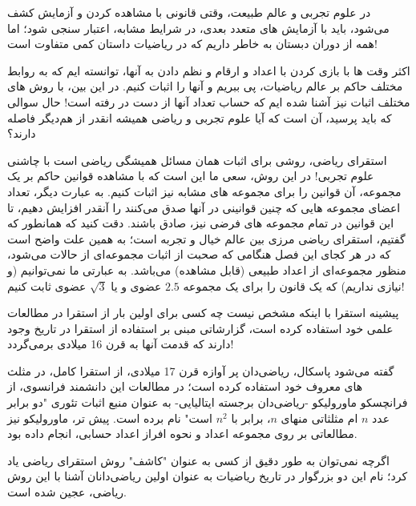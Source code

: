
 در علوم تجربی و عالم طبیعت، وقتی قانونی با مشاهده کردن و آزمایش کشف می‌شود، باید با آزمایش های متعدد بعدی، در شرایط مشابه، اعتبار سنجی شود؛
 اما همه از دوران دبستان به خاطر داریم که در ریاضیات داستان کمی متفاوت است! 

 اکثر وقت ها با بازی کردن با اعداد و ارقام و نظم دادن به آنها، توانسته ایم که به روابط مختلف حاکم بر عالم ریاضیات، پی ببریم و آنها را اثبات کنیم.
 در این بین، با روش های مختلف اثبات نیز آشنا شده ایم که حساب تعداد آنها از دست در رفته است!
 حال سوالی که باید پرسید، آن است که آیا علوم تجربی و ریاضی همیشه انقدر از هم‌دیگر فاصله دارند؟
 
 استقرای ریاضی، روشی  برای اثبات همان مسائل همیشگی ریاضی است با چاشنی علوم تجربی!
 در این روش، سعی ما این است که با مشاهده قوانین حاکم بر یک مجموعه، آن قوانین را برای مجموعه های مشابه نیز اثبات کنیم.
 به عبارت دیگر، تعداد اعضای مجموعه هایی که چنین قوانینی در آنها صدق می‌کنند را آنقدر افزایش دهیم، تا این قوانین در تمام مجموعه های فرضی نیز، صادق باشند.
 دقت کنید که همانطور که گفتیم، استقرای ریاضی مرزی بین عالم خیال و تجربه است؛ به همین علت
  واضح است که در هر کجای این فصل هنگامی که صحبت از اثبات مجموعه‌ای از حالات می‌شود، منظور مجموعه‌ای از اعداد طبیعی (قابل مشاهده) می‌باشد.
  به عبارتی ما نمی‌توانیم (و نیازی نداریم) که یک قانون را برای یک مجموعه $2.5$ عضوی و یا 
  $\sqrt{3}$
  عضوی ثابت کنیم!\newline

  \begin{EXTRA}{پیشینه استقرا}
    با اینکه مشخص نیست چه کسی برای اولین بار از استقرا در مطالعات علمی خود استفاده کرده است، گزارشاتی مبنی
    بر استفاده از استقرا در تاریخ وجود دارند که قدمت آنها به قرن 16 میلادی برمی‌گردد!
    
    گفته می‌شود پاسکال، ریاضی‌دان پر آوازه قرن 17 میلادی، از استقرا کامل، در مثلث های معروف خود استفاده کرده است؛
    در مطالعات این دانشمند فرانسوی، از فرانچسکو ماورولیکو -ریاضی‌دان برجسته ایتالیایی- به عنوان منبع اثبات تئوری 
    "دو برابر عدد
    $n$
    ام مثلثاتی منهای
    $n$،
    برابر با 
    $n^2$
    است"
    نام برده است.
    پیش‌ تر، ماورولیکو نیز مطالعاتی بر روی مجموعه اعداد و نحوه افراز اعداد حسابی، انجام داده بود.
    
    اگرچه نمی‌توان به طور دقیق از کسی به عنوان "کاشف" روش استقرای ریاضی یاد کرد؛ نام این دو بزرگوار در 
    تاریخ ریاضیات به عنوان اولین ریاضی‌دانان آشنا با این روش ریاضی، عجین شده است.

  \end{EXTRA}